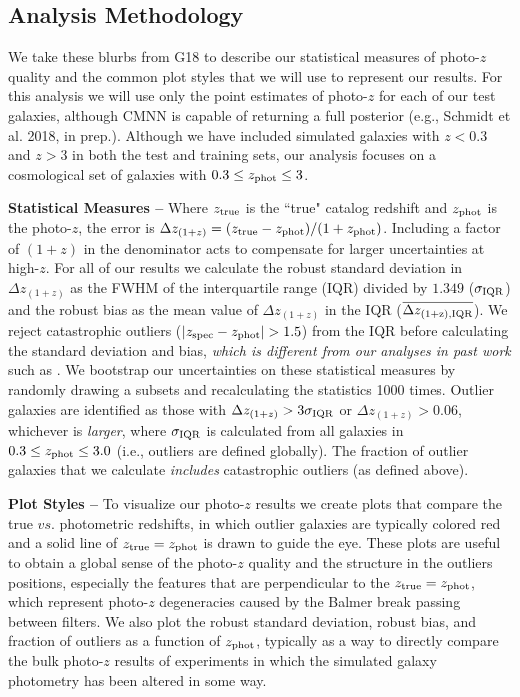 \subsection{Analysis Methodology}\label{ssec:pz_exp_meth}

We take these blurbs from G18 to describe our statistical measures of photo-$z$ quality and the common plot styles that we will use to represent our results. For this analysis we will use only the point estimates of photo-$z$ for each of our test galaxies, although CMNN is capable of returning a full posterior (e.g., Schmidt et al. 2018, in prep.). Although we have included simulated galaxies with $z<0.3$ and $z>3$ in both the test and training sets, our analysis focuses on a cosmological set of galaxies with $0.3 \leq z_{\rm phot} \leq 3$.

{\bf Statistical Measures --} Where $z_{\rm true}$ is the ``true" catalog redshift and $z_{\rm phot}$ is the photo-$z$, the error is $\Delta z_{(1+z)} = (z_{\rm true} - z_{\rm phot})/(1+z_{\rm phot})$. Including a factor of $(1+z)$ in the denominator acts to compensate for larger uncertainties at high-$z$. For all of our results we calculate the robust standard deviation in $\Delta z_{(1+z)}$ as the FWHM of the interquartile range (IQR) divided by $1.349$ ($\sigma_{\rm IQR}$) and the robust bias as the mean value of $\Delta z_{(1+z)}$ in the IQR ($\overline{\Delta z_{\rm(1+z), IQR}}$). We reject catastrophic outliers ($|z_{\rm spec}-z_{\rm phot}| > 1.5$) from the IQR before calculating the standard deviation and bias, {\em which is different from our analyses in past work} such as \cite{2018AJ....155....1G}. We bootstrap our uncertainties on these statistical measures by randomly drawing a subsets and recalculating the statistics 1000 times. Outlier galaxies are identified as those with $\Delta z_{(1+z)} > 3\sigma_{\rm IQR}$ or $\Delta z_{(1+z)} > 0.06$, whichever is {\it larger}, where $\sigma_{\rm IQR}$ is calculated from all galaxies in $0.3 \leq z_{\rm phot} \leq 3.0$ (i.e., outliers are defined globally). The fraction of outlier galaxies that we calculate {\it includes} catastrophic outliers (as defined above).

{\bf Plot Styles --} To visualize our photo-$z$ results we create plots that compare the true $vs.$ photometric redshifts, in which outlier galaxies are typically colored red and a solid line of $z_{\rm true} = z_{\rm phot}$ is drawn to guide the eye. These plots are useful to obtain a global sense of the photo-$z$ quality and the structure in the outliers positions, especially the features that are perpendicular to the $z_{\rm true} = z_{\rm phot}$, which represent photo-$z$ degeneracies caused by the Balmer break passing between filters. We also plot the robust standard deviation, robust bias, and fraction of outliers as a function of $z_{\rm phot}$, typically as a way to directly compare the bulk photo-$z$ results of experiments in which the simulated galaxy photometry has been altered in some way. 


